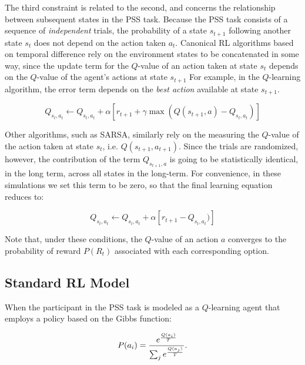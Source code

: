 \documentclass[10pt,letterpaper]{article}
\begin{document}
The third constraint is related to the second, and concerns the relationship between subsequent states in the PSS task. Because the PSS task consists of a sequence of \emph{independent} trials, the probability of a state $s_{t+1}$ following another state $s_{t}$ does not depend on the action taken $a_t$. Canonical RL algorithms based on temporal difference rely on the environment states to be concatenated in some way, since the update term for the $Q$-value of an action taken at state $s_t$ depends on the $Q$-value of the agent's actions at state $s_{t+1}$ For example, in the $Q$-learning algorithm, the error term depends on the \emph{best action} available at state $s_{t+1}$.

\begin{equation}
Q_{s_t,a_t} \leftarrow Q_{s_t,a_t} + \alpha [r_{t+1} + \gamma \max(Q(s_{t+1}, a) - Q_{s_t,a_t})]
\end{equation}

Other algorithms, such as SARSA, similarly rely on the measuring the $Q$-value of the action taken at state $s_t$, i.e. $Q(s_{t+1}, a_{t+1})$. Since the trials are randomized, however, the contribution of the term $Q_{s_{t+1}, a}$ is going to be statistically identical, in the long term, across all states in the long-term. For convenience, in these simulations we set this term to be zero, so that the final learning equation reduces to:

\begin{equation}
Q_{s_t,a_t} \leftarrow Q_{s_t,a_t} + \alpha [r_{t+1} - Q_{s_t,a_t})]
\end{equation}

Note that, under these conditions, the $Q$-value of an action $a$ converges to the probability of reward $P(R_t)$ associated with each corresponding option.

\subsection{Standard RL Model}

When the participant in the PSS task is modeled as a $Q$-learning agent that employs a policy based on the Gibbs function:

\begin{equation}
P(a_i) = \frac{e^{\frac{Q(a_i)}{T}}}{\sum_{j} e^{\frac{Q(a_j)}{T}}}\\.
\end{equation}
\end{document}
